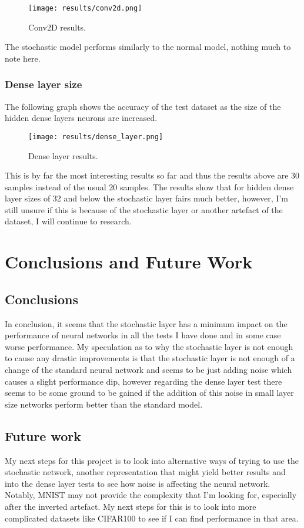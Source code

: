 \documentclass[a4paper,oneside,phd,etd]{BYUPhys}
\begin{document}
\begin{figure}[H]
\centering
\texttt{[image: results/conv2d.png]}
\caption{Conv2D results.}
\label{fig:conv2d}
\end{figure}
The stochastic model performs similarly to the normal model, nothing much to note here.

\subsection{Dense layer size}
The following graph shows the accuracy of the test dataset as the size of the hidden dense layers neurons are increased.
\begin{figure}[H]
\centering
\texttt{[image: results/dense\_layer.png]}
\caption{Dense layer results.}
\label{fig:denselayer}
\end{figure}

This is by far the most interesting results so far and thus the results above are 30 samples instead of the usual 20 samples. The results show that for hidden dense layer sizes of 32 and below the stochastic layer fairs much better, however, I'm still unsure if this is because of the stochastic layer or another artefact of the dataset, I will continue to research.

\chapter{Conclusions and Future Work}
\label{chap:Conclusions}

\section{Conclusions}
\label{sec:ConclusionsConclusions}
In conclusion, it seems that the stochastic layer has a minimum impact on the performance of neural networks in all the tests I have done and in some case worse performance. My speculation as to why the stochastic layer is not enough to cause any drastic improvements is that the stochastic layer is not enough of a change of the standard neural network and seems to be just adding noise which causes a slight performance dip, however regarding the dense layer test there seems to be some ground to be gained if the addition of this noise in small layer size networks perform better than the standard model.

\section{Future work}
\label{sec:ConclustionsFuturework}
My next steps for this project is to look into alternative ways of trying to use the stochastic network, another representation that might yield better results and into the dense layer tests to see how noise is affecting the neural network.
Notably, MNIST may not provide the complexity that I'm looking for, especially after the inverted artefact. My next steps for this is to look into more complicated datasets like CIFAR100 to see if I can find performance in that area.
\end{document}
